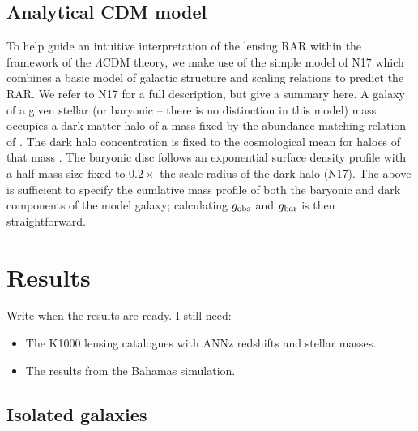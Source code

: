 \documentclass[usenatbib]{mnras}
\begin{document}
\subsection{Analytical CDM model}
\label{sec:analytical}

To help guide an intuitive interpretation of the lensing RAR within the framework of the $\Lambda$CDM theory, we make use of the simple model of N17 which combines a basic model of galactic structure and scaling relations to predict the RAR. We refer to N17 for a full description, but give a summary here. A galaxy of a given stellar (or baryonic -- there is no distinction in this model)  mass occupies a dark matter halo of a mass fixed by the abundance matching relation of \citet{Behroozi13}. The dark halo concentration is fixed to the cosmological mean for haloes of that mass \citep{Ludlow14}. The baryonic disc follows an exponential surface density profile with a half-mass size fixed to $0.2\times$ the scale radius of the dark halo (N17). The above is sufficient to specify the cumlative mass profile of both the baryonic and dark components of the model galaxy; calculating $g_{\rm obs}$ and $g_{\rm bar}$ is then straightforward.

\section{Results}
\label{sec:results}
Write when the results are ready.
I still need:
\begin{itemize}
	\item The K1000 lensing catalogues with ANNz redshifts and stellar masses.
	\item The results from the Bahamas simulation.
\end{itemize}

\subsection{Isolated galaxies}
\end{document}
